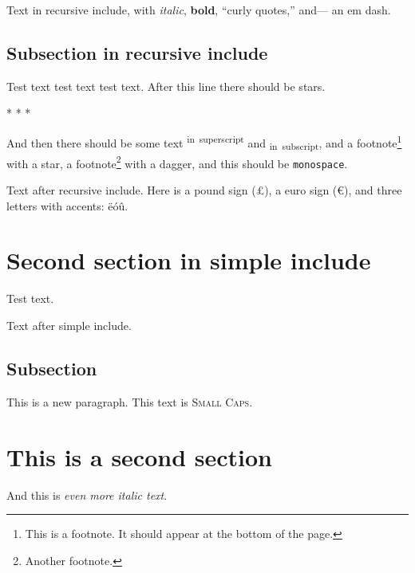\documentclass[
  12pt,
  british,
  a4paper,
]{article}
\newif\iffootnote
\let\Footnote\footnote
\renewcommand\footnote[1]{\begingroup\footnotetrue\Footnote{#1}\endgroup}
\let\OldRule\rule
\renewcommand{\rule}[2]{\iffootnote\OldRule{#1}{#2}\else* * *\fi}
\begin{document}
Text in recursive include, with \emph{italic}, \textbf{bold}, ``curly
quotes,'' and--- an em dash.

\hypertarget{subsection-in-recursive-include}{%
\subsection{Subsection in recursive
include}\label{subsection-in-recursive-include}}

Test text test text test text. After this line there should be stars.

\begin{center}\rule{0.5\linewidth}{0.5pt}\end{center}

And then there should be some text \textsuperscript{in~superscript} and
\textsubscript{in~subscript}, and a footnote\footnote{This is a
  footnote. It should appear at the bottom of the page.} with a star, a
footnote\footnote{Another footnote.} with a dagger, and this should be
\texttt{monospace}.

Text after recursive include. Here is a pound sign (£), a euro sign (€),
and three letters with accents: ëóû.

\hypertarget{second-section-in-simple-include}{%
\section{Second section in simple
include}\label{second-section-in-simple-include}}

Test text.

Text after simple include.

\hypertarget{subsection}{%
\subsection{Subsection}\label{subsection}}

This is a new paragraph. This text is \textsc{Small Caps}.

\hypertarget{this-is-a-second-section}{%
\section{This is a second section}\label{this-is-a-second-section}}

And this is \emph{even more italic text}.
\end{document}
